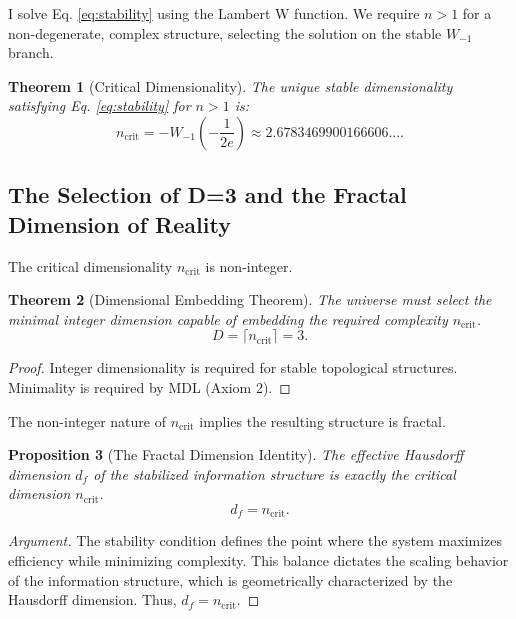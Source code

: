 \documentclass[11pt, a4paper]{article}
\newtheorem{theorem}{Theorem}[section]
\newtheorem{proposition}[theorem]{Proposition}
\theoremstyle{definition}
\theoremstyle{definition}
\newcommand{\df}{d_f} %
\newcommand{\ncrit}{n_{\mathrm{crit}}}
\newcommand{\ncritval}{2.6783469900166606...}
\begin{document}
I solve Eq. \eqref{eq:stability} using the Lambert W function. We require $n>1$ for a non-degenerate, complex structure, selecting the solution on the stable $W_{-1}$ branch.
\begin{theorem}[Critical Dimensionality]\label{thm:ncrit}
The unique stable dimensionality satisfying Eq. \eqref{eq:stability} for $n>1$ is:
\begin{equation}
    \ncrit = -W_{-1}\left(-\frac{1}{2e}\right) \approx \ncritval.
\end{equation}
\end{theorem}

\subsection{The Selection of D=3 and the Fractal Dimension of Reality}

The critical dimensionality $\ncrit$ is non-integer.

\begin{theorem}[Dimensional Embedding Theorem]\label{thm:Embedding}
The universe must select the minimal integer dimension capable of embedding the required complexity $\ncrit$.
\begin{equation}
    D = \lceil \ncrit \rceil = 3.
\end{equation}
\end{theorem}
\begin{proof}
Integer dimensionality is required for stable topological structures. Minimality is required by MDL (Axiom 2).
\end{proof}


The non-integer nature of $\ncrit$ implies the resulting structure is fractal.

\begin{proposition}[The Fractal Dimension Identity]\label{prop:fractal_dim}
The effective Hausdorff dimension $\df$ of the stabilized information structure is exactly the critical dimension $\ncrit$.
\begin{equation}
    \df = \ncrit.
\end{equation}
\end{proposition}
\begin{proof}[Argument]
The stability condition defines the point where the system maximizes efficiency while minimizing complexity. This balance dictates the scaling behavior of the information structure, which is geometrically characterized by the Hausdorff dimension. Thus, $\df = \ncrit$.
\end{proof}
\end{document}
